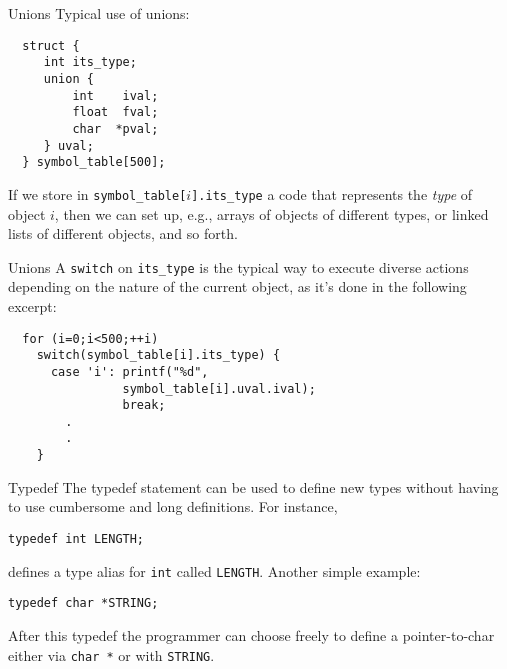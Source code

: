 \begin{frame}[fragile]{Unions}
Typical use of unions:


\vspace{20pt}

\begin{tt}
\begin{verbatim}
  struct {
     int its_type;
     union {
         int    ival;
         float  fval;
         char  *pval;
     } uval;
  } symbol_table[500];
\end{verbatim}
\end{tt}


\vspace{20pt}

If we store in
{\tt symbol\_table[$i$].its\_type} a code that represents the {\em type\/} of object
$i$, then we can set up, e.g., arrays of objects of different types,
or linked lists of different objects, and so forth.


\end{frame}
\begin{frame}[fragile]{Unions}
A {\tt switch} on {\tt its\_type} is the typical way to execute
diverse actions depending on the nature of the current object,
as it's done in the following excerpt:


\vspace{20pt}

\begin{tt}
\begin{verbatim}
  for (i=0;i<500;++i)
    switch(symbol_table[i].its_type) {
      case 'i': printf("%d",
                symbol_table[i].uval.ival);
                break;
        .
        .
    }
\end{verbatim}
\end{tt}


\end{frame}
\begin{frame}[fragile]{Typedef}
The typedef statement can be used to define new types
without having to use cumbersome and long definitions. For
instance,


\vspace{20pt}

\begin{center}\tt typedef int LENGTH;\end{center}
defines a type alias for {\tt int} called {\tt LENGTH}.
Another simple example:


\vspace{20pt}

\begin{center}\tt typedef char *STRING;\end{center}


\vspace{20pt}

After this typedef the programmer can choose freely to
define a pointer-to-char either via
{\tt char *} or with {\tt STRING}.


\end{frame}
